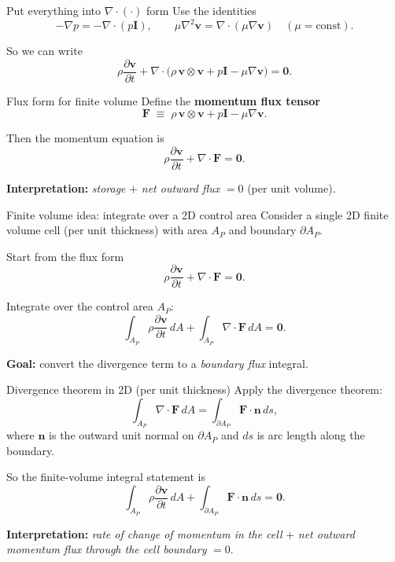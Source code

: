 \documentclass[aspectratio=169]{beamer}
\begin{document}
\begin{frame}{Put everything into $\nabla\cdot(\cdot)$ form}
Use the identities
\[
-\nabla p = -\nabla\cdot(p\mathbf{I}),
\qquad
\mu\nabla^2\mathbf{v} = \nabla\cdot(\mu\nabla\mathbf{v})
\quad (\mu=\text{const}).
\]

\bigskip
So we can write
\[
\rho\frac{\partial \mathbf{v}}{\partial t}
+
\nabla\cdot\Big(\rho\,\mathbf{v}\otimes\mathbf{v}
+ p\mathbf{I}
-\mu\nabla\mathbf{v}\Big)
=\mathbf{0}.
\]
\end{frame}
\begin{frame}{Flux form for finite volume}
Define the \textbf{momentum flux tensor}
\[
\mathbf{F}
\;\equiv\;
\rho\,\mathbf{v}\otimes\mathbf{v}
+ p\mathbf{I}
-\mu\nabla\mathbf{v}.
\]

\bigskip
Then the momentum equation is
\[
\boxed{
\rho \frac{\partial \mathbf{v}}{\partial t}
+\nabla\cdot\mathbf{F}
=
\mathbf{0}.
}
\]

\bigskip
\textbf{Interpretation:} \emph{storage} $+$ \emph{net outward flux} $=0$ (per unit volume).
\end{frame}

\begin{frame}{Finite volume idea: integrate over a 2D control area}
Consider a single 2D finite volume cell (per unit thickness) with area $A_P$
and boundary $\partial A_P$.

\bigskip
Start from the flux form
\[
\rho \frac{\partial \mathbf{v}}{\partial t}+\nabla\cdot\mathbf{F}=\mathbf{0}.
\]

\bigskip
Integrate over the control area $A_P$:
\[
\int_{A_P}\rho \frac{\partial \mathbf{v}}{\partial t}\,dA
+
\int_{A_P}\nabla\cdot\mathbf{F}\,dA
=
\mathbf{0}.
\]

\bigskip
\textbf{Goal:} convert the divergence term to a \emph{boundary flux} integral.
\end{frame}
\begin{frame}{Divergence theorem in 2D (per unit thickness)}
Apply the divergence theorem:
\[
\int_{A_P}\nabla\cdot\mathbf{F}\,dA
=
\int_{\partial A_P}\mathbf{F}\cdot\mathbf{n}\,ds,
\]
where $\mathbf{n}$ is the outward unit normal on $\partial A_P$ and $ds$ is
arc length along the boundary.

\bigskip
So the finite-volume integral statement is
\[
\boxed{
\int_{A_P}\rho \frac{\partial \mathbf{v}}{\partial t}\,dA
+
\int_{\partial A_P}\mathbf{F}\cdot\mathbf{n}\,ds
=
\mathbf{0}.
}
\]

\bigskip
\textbf{Interpretation:} \emph{rate of change of momentum in the cell}
$+$ \emph{net outward momentum flux through the cell boundary} $=0$.
\end{frame}
\end{document}
